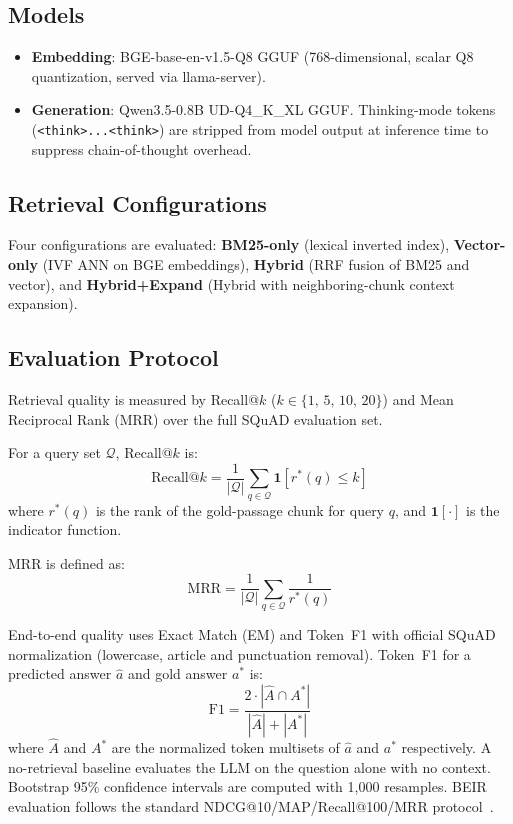 \documentclass[conference]{IEEEtran}
\begin{document}
\subsection{Models}
\begin{itemize}
  \item \textbf{Embedding}: BGE-base-en-v1.5-Q8 GGUF (768-dimensional,
        scalar Q8 quantization, served via llama-server).
  \item \textbf{Generation}: Qwen3.5-0.8B UD-Q4\_K\_XL GGUF. Thinking-mode
        tokens (\texttt{<think>...<\/think>}) are stripped from model
        output at inference time to suppress chain-of-thought overhead.
\end{itemize}

\subsection{Retrieval Configurations}
Four configurations are evaluated: \textbf{BM25-only} (lexical inverted
index), \textbf{Vector-only} (IVF ANN on BGE embeddings),
\textbf{Hybrid} (RRF fusion of BM25 and vector), and
\textbf{Hybrid+Expand} (Hybrid with neighboring-chunk context expansion).

\subsection{Evaluation Protocol}
Retrieval quality is measured by Recall@$k$ ($k \in \{1,\,5,\,10,\,20\}$) and
Mean Reciprocal Rank (MRR) over the full SQuAD evaluation set.

For a query set $\mathcal{Q}$, Recall@$k$ is:
\begin{equation}
  \text{Recall@}k = \frac{1}{|\mathcal{Q}|}
    \sum_{q \in \mathcal{Q}}
    \mathbf{1}\!\left[r^*(q) \leq k\right]
  \label{eq:recall}
\end{equation}
where $r^*(q)$ is the rank of the gold-passage chunk for query $q$, and
$\mathbf{1}[\cdot]$ is the indicator function.

MRR is defined as:
\begin{equation}
  \text{MRR} = \frac{1}{|\mathcal{Q}|}\sum_{q \in \mathcal{Q}}
    \frac{1}{r^*(q)}
  \label{eq:mrr}
\end{equation}

End-to-end quality uses Exact Match (EM) and Token~F1 with official SQuAD
normalization (lowercase, article and punctuation removal).
Token~F1 for a predicted answer $\hat{a}$ and gold answer $a^*$ is:
\begin{equation}
  \text{F1} = \frac{2 \cdot |\hat{A} \cap A^*|}{|\hat{A}| + |A^*|}
  \label{eq:f1}
\end{equation}
where $\hat{A}$ and $A^*$ are the normalized token multisets of $\hat{a}$
and $a^*$ respectively. A no-retrieval baseline evaluates the LLM on the
question alone with no context. Bootstrap 95\% confidence intervals are
computed with 1{,}000 resamples. BEIR evaluation follows the standard
NDCG@10/MAP/Recall@100/MRR protocol~\cite{b23}.
\end{document}
